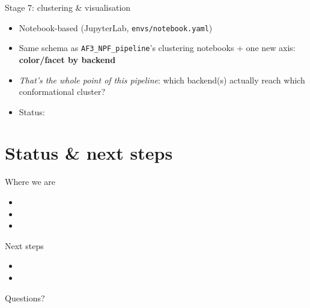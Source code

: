 \documentclass[aspectratio=169]{beamer}
\begin{document}
\begin{frame}{Stage 7: clustering \& visualisation}
  \begin{itemize}
    \item Notebook-based (JupyterLab, \texttt{envs/notebook.yaml})
    \item Same schema as \texttt{AF3\_NPF\_pipeline}'s clustering notebooks
      + one new axis: \textbf{color/facet by backend}
    \item \emph{That's the whole point of this pipeline}: which backend(s)
      actually reach which conformational cluster?
    \item Status: %
  \end{itemize}
\end{frame}

\section{Status \& next steps}

\begin{frame}{Where we are}
  \begin{itemize}
    \item %
    \item %
    \item %
  \end{itemize}
\end{frame}

\begin{frame}{Next steps}
  \begin{itemize}
    \item %
    \item %
  \end{itemize}
\end{frame}

\begin{frame}
  \centering
  \Huge Questions?
\end{frame}
\end{document}
